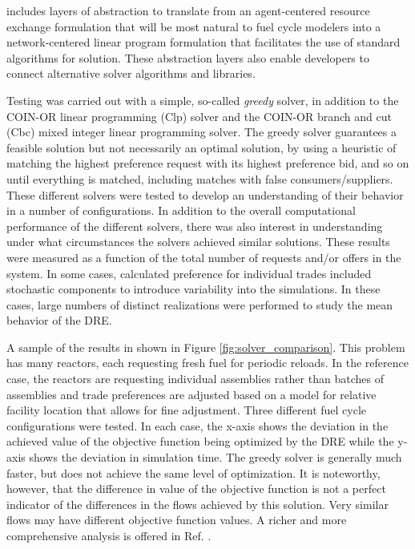 \Cyclus{} includes layers of abstraction to translate from an agent-centered
resource exchange formulation that will be most natural to fuel cycle modelers
into a network-centered linear program formulation that facilitates the use of
standard algorithms for solution.  These abstraction layers also enable
developers to connect alternative solver algorithms and libraries.

Testing was carried out with a simple, so-called \textit{greedy} solver, in
addition to the \gls{COIN-OR} linear programming (Clp) solver and the
\gls{COIN-OR} branch and cut (Cbc) mixed integer linear programming solver.
The greedy solver guarantees a feasible solution but not necessarily an
optimal solution, by using a heuristic of matching the highest preference
request with its highest preference bid, and so on until everything is
matched, including matches with false consumers/suppliers.  These different
solvers were tested to develop an understanding of their behavior in a number
of configurations. In addition to the overall computational
performance of the different solvers, there was also interest in understanding
under what circumstances the solvers achieved similar solutions.  These
results were measured as a function of the total number of requests and/or
offers in the system.  In some cases, calculated preference for individual
trades included stochastic components to introduce variability into the
simulations.  In these cases, large numbers of distinct realizations were
performed to study the mean behavior of the \gls{DRE}.

A sample of the results in shown in Figure \ref{fig:solver_comparison}.  This
problem has many reactors, each requesting fresh fuel for periodic reloads.
In the reference case, the reactors are requesting individual assemblies
rather than batches of assemblies and trade preferences are adjusted based on
a model for relative facility location that allows for fine adjustment.  Three
different fuel cycle configurations were tested. In each case, the x-axis
shows the deviation in the achieved value of the objective function being
optimized by the \gls{DRE} while the y-axis shows the deviation in simulation
time.  The greedy solver is generally much faster, but does not achieve the
same level of optimization.  It is noteworthy, however, that the difference in
value of the objective function is not a perfect indicator of the differences
in the flows achieved by this solution.  Very similar flows may have different
objective function values.  A richer and more comprehensive analysis is
offered in Ref. .

